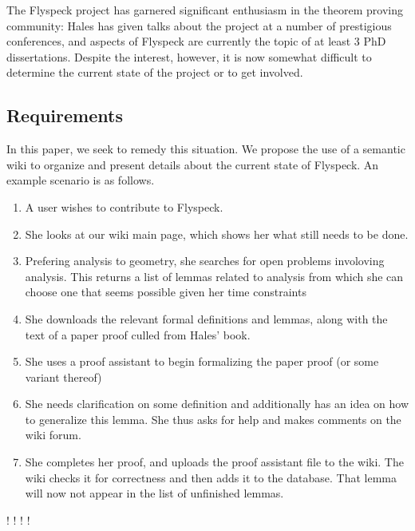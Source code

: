 The Flyspeck project has garnered significant enthusiasm in the theorem proving
community: Hales has given talks about the project at a number of
prestigious conferences, and aspects of Flyspeck are currently the topic of at least
3 PhD dissertations.  Despite the interest, however, it is now somewhat difficult to 
determine the current state of the project or to get involved.  



\subsection{Requirements}
In this paper, we seek to remedy this situation.  We propose the use of a 
semantic wiki to organize and present details about the current state of Flyspeck.
An example scenario is as follows.  

\begin{enumerate}  %
\item A user wishes to contribute to Flyspeck. %
\item She looks at our wiki main page, which shows her what still needs to be done. %
\item Prefering analysis to geometry, she searches for open problems involoving analysis.  %
  This returns a list of lemmas related to analysis from which she can choose one that %
  seems possible given her time constraints %
\item She downloads the relevant formal definitions and lemmas, along with the text %
  of a paper proof culled from Hales' book. %
\item She uses a proof assistant to begin formalizing the paper proof (or some variant thereof) %
\item She needs clarification on some definition and additionally has an idea on how to generalize this %
  lemma.  She thus asks for help and makes comments on the wiki forum.   %
\item She completes her proof, and uploads the proof assistant file to the wiki. %
  The wiki checks it for correctness and then adds it to the database.  That lemma will %
  now not appear in the list of unfinished lemmas. %
\end{enumerate}  %


!%
!%
!%
!%



